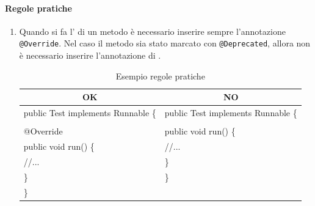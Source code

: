 \paragraph{Regole pratiche}
\begin{enumerate}
	\item Quando si fa l’ di un metodo è necessario inserire sempre l’annotazione \texttt{@Override}. Nel caso il metodo sia stato marcato con \texttt{@Deprecated}, allora non è necessario inserire l’annotazione di .
	\begin{table} [H]
		\begin{center}
			\begin{tabular}{ | l | l |}
				\multicolumn{1}{c}{\textbf{OK}}&\multicolumn{1}{c}{\textbf{NO}}\\ 
				\hline
				public Test implements Runnable \{& public Test implements Runnable \{\\
				&\\
				\hspace{0.5cm}@Override & \hspace{0.5cm}public void run() \{ \\
				\hspace{0.5cm}public void run() \{& \hspace{1cm}//...\\
				\hspace{1cm}//... & \hspace{0.5cm}\} \\
				\hspace{0.5cm}\}&\}\\
				\}&\\
				\hline
			\end{tabular}
		\end{center}
		\caption{Esempio regole pratiche}
	\end{table}
		

\end{enumerate}
